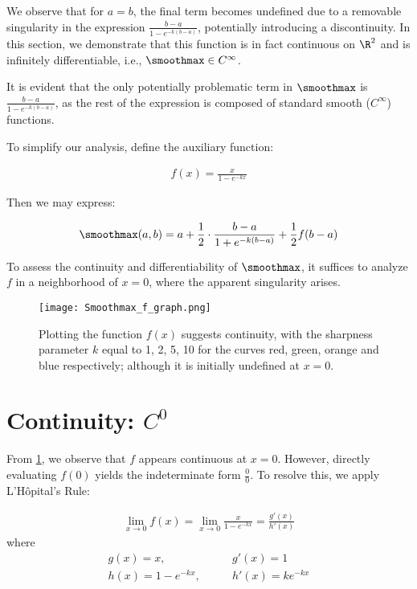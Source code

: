 We observe that for $a = b$, the final term becomes undefined due to a removable singularity in the expression $\frac{b - a}{1 - e^{-k(b - a)}}$, potentially introducing a discontinuity. In this section, we demonstrate that this function is in fact continuous on $\R^2$ and is infinitely differentiable, i.e., $\smoothmax \in C^\infty$.

It is evident that the only potentially problematic term in $\smoothmax$ is $\frac{b - a}{1 - e^{-k(b - a)}}$, as the rest of the expression is composed of standard smooth ($C^\infty$) functions.

To simplify our analysis, define the auxiliary function:

\begin{align}
    f(x) = \frac{x}{1 - e^{-kx}}
\end{align}

Then we may express:

\begin{align}
    \smoothmax(a, b) = a + \frac{1}{2} \cdot \frac{b - a}{1 + e^{-k(b - a)}} + \frac{1}{2} f(b - a)
\end{align}

To assess the continuity and differentiability of $\smoothmax$, it suffices to analyze $f$ in a neighborhood of $x = 0$, where the apparent singularity arises.

\begin{figure}
    \texttt{[image: Smoothmax\_f\_graph.png]}
    \caption{Plotting the function $f(x)$ suggests continuity, with the sharpness parameter $k$ equal to 1, 2, 5, 10 for the curves red, green, orange and blue respectively; although it is initially undefined at $x = 0$.}
    \label{fig:smoothmax-f-plot}
\end{figure}

\section{Continuity: $C^0$}

From \cref{fig:smoothmax-f-plot}, we observe that $f$ appears continuous at $x = 0$. However, directly evaluating $f(0)$ yields the indeterminate form $\frac{0}{0}$. To resolve this, we apply L'Hôpital's Rule:

\begin{align}
    \lim_{x \to 0} f(x) = \lim_{x \to 0} \frac{x}{1 - e^{-kx}} = \frac{g'(x)}{h'(x)}
\end{align}
where
\begin{align}
    g(x) = x, \quad & \quad g'(x) = 1 \\
    h(x) = 1 - e^{-kx}, \quad & \quad h'(x) = k e^{-kx}
\end{align}

